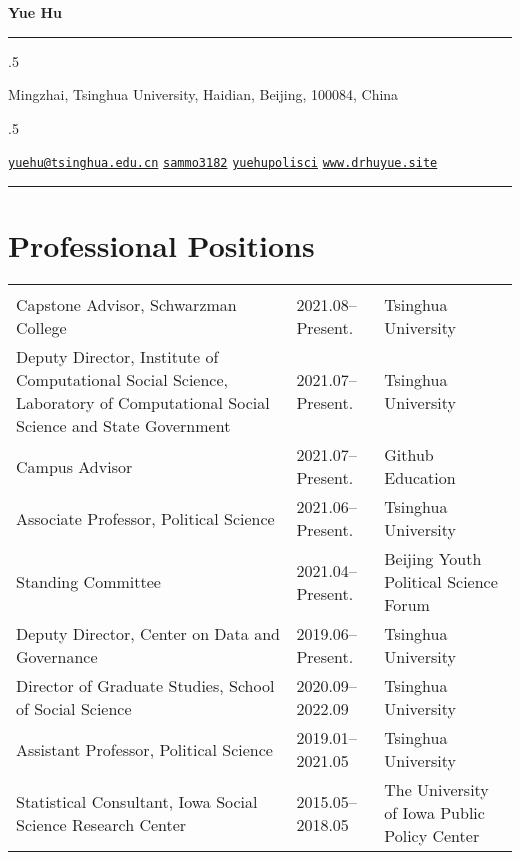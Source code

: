 \documentclass[
  12pt,
]
{article}
\begin{document}
\centerline{\huge \bf Yue Hu}

\vspace{2 mm}

\hrule

\vspace{2 mm}


\moveleft.5\hoffset\centerline{Mingzhai, Tsinghua University, Haidian,
Beijing, 100084, China}
\moveleft.5\hoffset\centerline{ \faEnvelopeO \hspace{1 mm} \href{mailto:}{\tt yuehu@tsinghua.edu.cn} \hspace{1 mm}  \faGithub \hspace{1 mm} \href{http://github.com/sammo3182}{\tt sammo3182} \hspace{1 mm}   \faTwitter \hspace{1 mm} \href{https:/twitter.com/yuehupolisci}{\tt yuehupolisci} \hspace{1 mm}    \faGlobe \hspace{1 mm} \href{http://www.drhuyue.site}{\tt www.drhuyue.site}   }



\vspace{2 mm}

\hrule



\section{Professional Positions}\label{professional-positions}

\begin{longtable*}[t]{>{\raggedright\arraybackslash}p{20em}l>{\raggedright\arraybackslash}p{10em}}

 &  & \\

Capstone Advisor, Schwarzman College & 2021.08--Present. & Tsinghua University\\
Deputy Director, Institute of Computational Social Science, Laboratory of Computational Social Science and State Government & 2021.07--Present. & Tsinghua University\\
Campus Advisor & 2021.07--Present. & Github Education\\
Associate Professor, Political Science & 2021.06--Present. & Tsinghua University\\
Standing Committee & 2021.04--Present. & Beijing Youth Political Science Forum\\
\addlinespace
Deputy Director, Center on Data and Governance & 2019.06--Present. & Tsinghua University\\
Director of Graduate Studies, School of Social Science & 2020.09--2022.09 & Tsinghua University\\
Assistant Professor, Political Science & 2019.01--2021.05 & Tsinghua University\\
Statistical Consultant, Iowa Social Science Research Center & 2015.05--2018.05 & The University of Iowa Public Policy Center\\

\end{longtable*}
\end{document}
